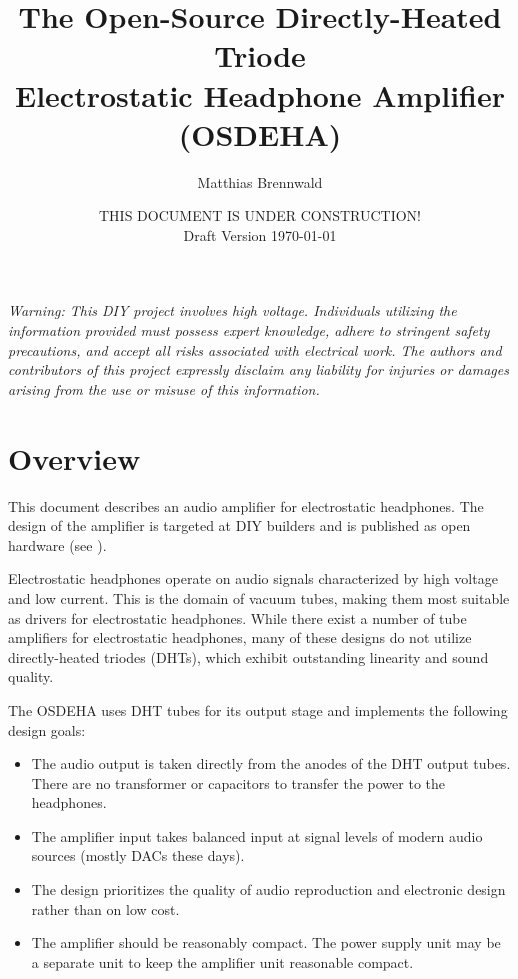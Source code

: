 


\title{The Open-Source Directly-Heated Triode \\ Electrostatic Headphone Amplifier \\ (OSDEHA)}
\author{Matthias Brennwald}
\date{THIS DOCUMENT IS UNDER CONSTRUCTION!\\ Draft Version \today}




\maketitle

\emph{Warning: This DIY project involves high voltage. Individuals utilizing the information provided must possess expert knowledge, adhere to stringent safety precautions, and accept all risks associated with electrical work. The authors and contributors of this project expressly disclaim any liability for injuries or damages arising from the use or misuse of this information.}


\section{Overview}

This document describes an audio amplifier for electrostatic headphones. The design of the amplifier is targeted at DIY builders and is published as open hardware (see ).

Electrostatic headphones operate on audio signals characterized by high voltage and low current. This is the domain of vacuum tubes, making them most suitable as drivers for electrostatic headphones.  While there exist a number of tube amplifiers for electrostatic headphones, many of these designs do not utilize directly-heated triodes (DHTs), which exhibit outstanding linearity and sound quality.\par

The OSDEHA uses DHT tubes for its output stage and implements the following design goals:
\begin{itemize}
\item The audio output is taken directly from the anodes of the DHT output tubes. There are no transformer or capacitors to transfer the power to the headphones.
\item The amplifier input takes balanced input at signal levels of modern audio sources (mostly DACs these days).
\item The design prioritizes the quality of audio reproduction and electronic design rather than on low cost.
\item The amplifier should be reasonably compact. The power supply unit may be a separate unit to keep the amplifier unit reasonable compact.
\end{itemize}

